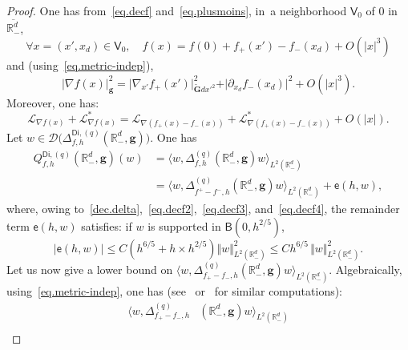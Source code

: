 \documentclass[JEP,XML,SOM,Unicode,NoEqCountersInSection,NoFloatCountersInSection,published]{cedram}
\newcommand{\mbf}[1]{\mathbf{#1}}
\let\lp\langle
\let\rp\rangle
\theoremstyle{plain}
\theoremstyle{definition}
\begin{document}
\begin{proof}

One has from~\eqref{eq.decf} and~\eqref{eq.plusmoins}, in~a neighborhood $ \mathsf V_0$ of $0$ in $\overline{\mathbb R^d_-}$, \begin{equation}\label{eq.decf2}
\forall x=(x',x_d)\in \mathsf V_0,\quad f(x)=f(0)+ f_+(x')- f_-(x_d) +O(\vert x\vert^3)
\end{equation}
and (using~\eqref{eq.metric-indep}),
\begin{equation}\label{eq.decf3}
\vert \nabla f(x)\vert_{{\mbf g}}^2= \vert \nabla_{x'} f_+(x')\vert_{\tilde {\mbf G}dx'^2}^2 + \vert \partial_{x_d} f_-(x_d)\vert^2 +O(\vert x\vert^3).
\end{equation}
Moreover, one has:
\begin{equation}\label{eq.decf4}
\mathcal L_{\nabla f(x)}+ \mathcal L_{\nabla f(x)}^*= \mathcal L_{\nabla (f_+(x)-f_-(x))}+ \mathcal L_{\nabla (f_+(x)-f_-(x))}^*+ O(\vert x \vert).
\end{equation}
Let $w\in \mathcal D\bigl(\Delta_{f,h}^{\mathsf{Di},(q)}(\mathbb R_-^d, \mbf g) \bigr)$.
One has
\begin{equation}\label{eq.ref1}
\begin{aligned}
Q_{f,h}^{\mathsf{Di},(q)}(\mathbb R^d_-, \mbf g)(w)&=\lp w,
\Delta_{f,h}^{(q)}(\mathbb
R^d_-, \mbf g)
w\rp_{L^2(\mathbb
R^d_-)}\\
&=\lp w, \Delta_{f^+-f^-,h}^{(q)}(\mathbb R^d_-, \mbf g)
w\rp_{L^2(\mathbb
R^d_-)} + \mathsf e(h,w),
\end{aligned}
\end{equation}
where, owing
to~\eqref{dec.delta},~\eqref{eq.decf2},~\eqref{eq.decf3},
and~\eqref{eq.decf4}, the remainder term $\mathsf e(h,w)$ satisfies: if $w$ is supported in $\mathsf B(0,h^{2/5 })$,
\begin{equation}\label{taux-erreur}
\vert \mathsf e(h,w)\vert \le C (h^{6/5}+ h\times h^{2/5}) \Vert w \Vert_{L^2(\mathbb R^d_-)}^2\le Ch^{6/5}\, \Vert w \Vert_{L^2(\mathbb R^d_-)}^2.
\end{equation}
Let us now give a lower bound on $ \lp w,\Delta^{(q)}_{f_+-f_-,h}(\mathbb R^d_-, \mbf g)w\rp_{L^2(\mathbb R^d_-)}$.
Algebraically, using~\eqref{eq.metric-indep}, one has
(see~\cite[Eq.\,(3.17)]{helffer-nier-06} or~\cite[Eq.\,(4.3.16)]{le-peutrec-10}
for similar computations):
\begin{align}
\label{eq.dec55}
\lp w,\Delta^{(q)}_{f_+-f_-,h}&(\mathbb R^d_-, \mbf g)w\rp_{L^2(\mathbb R^d_-)}\\
\nonumber

\end{align}
\end{proof}
\end{document}

